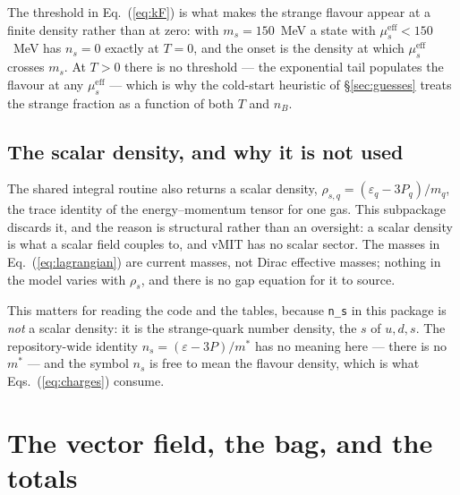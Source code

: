 \documentclass[aps,prc,onecolumn,superscriptaddress,nofootinbib,10pt]{revtex4-2}
\newcommand{\nB}{n_B}
\newcommand{\mueff}[1]{\mu^{\mathrm{eff}}_{#1}}
\begin{document}
The threshold in Eq.~(\ref{eq:kF}) is what makes the strange flavour appear at
a finite density rather than at zero: with $m_s = 150$~MeV a state with
$\mueff{s} < 150$~MeV has $n_s = 0$ exactly at $T = 0$, and the onset is the
density at which $\mueff{s}$ crosses $m_s$. At $T > 0$ there is no threshold
--- the exponential tail populates the flavour at any $\mueff{s}$ --- which is
why the cold-start heuristic of \S\ref{sec:guesses} treats the strange
fraction as a function of both $T$ and $\nB$.

\subsection{The scalar density, and why it is not used}

The shared integral routine also returns a scalar density,
$\rho_{s,q} = (\varepsilon_q - 3 P_q)/m_q$, the trace identity of the
energy--momentum tensor for one gas. This subpackage discards it, and the
reason is structural rather than an oversight: a scalar density is what a
scalar field couples to, and vMIT has no scalar sector. The masses in
Eq.~(\ref{eq:lagrangian}) are current masses, not Dirac effective masses;
nothing in the model varies with $\rho_s$, and there is no gap equation for it
to source.

This matters for reading the code and the tables, because \texttt{n\_s} in
this package is \emph{not} a scalar density: it is the strange-quark number
density, the $s$ of $u, d, s$. The repository-wide identity
$n_s = (\varepsilon - 3P)/m^*$ has no meaning here --- there is no $m^*$ ---
and the symbol $n_s$ is free to mean the flavour density, which is what
Eqs.~(\ref{eq:charges}) consume.

\section{The vector field, the bag, and the totals}
\label{sec:totals}
\end{document}
